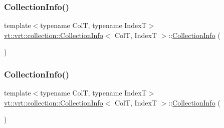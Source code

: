 \subsubsection{\texorpdfstring{Collection\+Info()}{CollectionInfo()}\hspace{0.1cm}{\footnotesize\ttfamily [1/3]}}
{\footnotesize\ttfamily template$<$typename ColT, typename IndexT$>$ \\
\hyperlink{structvt_1_1vrt_1_1collection_1_1_collection_info}{vt\+::vrt\+::collection\+::\+Collection\+Info}$<$ ColT, IndexT $>$\+::\hyperlink{structvt_1_1vrt_1_1collection_1_1_collection_info}{Collection\+Info} (\begin{DoxyParamCaption}{ }\end{DoxyParamCaption})\hspace{0.3cm}{\ttfamily [default]}}

\mbox{\label{structvt_1_1vrt_1_1collection_1_1_collection_info_a8b280b46f8afe9a170d718c08d8d5a54}} 
\subsubsection{\texorpdfstring{Collection\+Info()}{CollectionInfo()}\hspace{0.1cm}{\footnotesize\ttfamily [2/3]}}
{\footnotesize\ttfamily template$<$typename ColT, typename IndexT$>$ \\
\hyperlink{structvt_1_1vrt_1_1collection_1_1_collection_info}{vt\+::vrt\+::collection\+::\+Collection\+Info}$<$ ColT, IndexT $>$\+::\hyperlink{structvt_1_1vrt_1_1collection_1_1_collection_info}{Collection\+Info} (\begin{DoxyParamCaption}\item[{\hyperlink{structvt_1_1vrt_1_1collection_1_1_collection_info}{Collection\+Info}$<$ ColT, IndexT $>$ const \&}]{ }\end{DoxyParamCaption})\hspace{0.3cm}{\ttfamily [default]}}

\mbox{\label{structvt_1_1vrt_1_1collection_1_1_collection_info_a8f1f1ea8fffa846772e35288afad5767}} 
